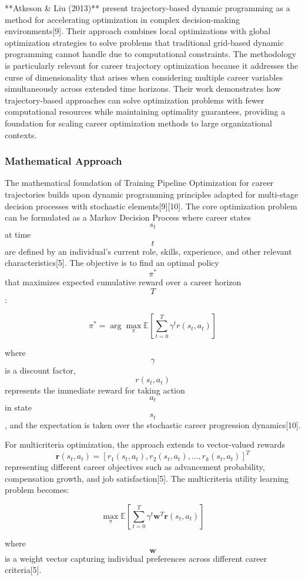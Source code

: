 \documentclass[main.tex]{subfiles}
\begin{document}
**Atkeson \& Liu (2013)** present trajectory-based dynamic programming as a method for accelerating optimization in complex decision-making environments[9]. Their approach combines local optimizations with global optimization strategies to solve problems that traditional grid-based dynamic programming cannot handle due to computational constraints. The methodology is particularly relevant for career trajectory optimization because it addresses the curse of dimensionality that arises when considering multiple career variables simultaneously across extended time horizons. Their work demonstrates how trajectory-based approaches can solve optimization problems with fewer computational resources while maintaining optimality guarantees, providing a foundation for scaling career optimization methods to large organizational contexts.

\subsubsection{Mathematical Approach}

The mathematical foundation of Training Pipeline Optimization for career trajectories builds upon dynamic programming principles adapted for multi-stage decision processes with stochastic elements[9][10]. The core optimization problem can be formulated as a Markov Decision Process where career states $$s_t$$ at time $$t$$ are defined by an individual's current role, skills, experience, and other relevant characteristics[5]. The objective is to find an optimal policy $$\pi^*$$ that maximizes expected cumulative reward over a career horizon $$T$$:

$$
\pi^* = \arg\max_\pi \mathbb{E}\left[\sum_{t=0}^T \gamma^t r(s_t, a_t)\right]
$$

where $$\gamma$$ is a discount factor, $$r(s_t, a_t)$$ represents the immediate reward for taking action $$a_t$$ in state $$s_t$$, and the expectation is taken over the stochastic career progression dynamics[10].

For multicriteria optimization, the approach extends to vector-valued rewards $$\mathbf{r}(s_t, a_t) = [r_1(s_t, a_t), r_2(s_t, a_t), \ldots, r_k(s_t, a_t)]^T$$ representing different career objectives such as advancement probability, compensation growth, and job satisfaction[5]. The multicriteria utility learning problem becomes:

$$
\max_\pi \mathbb{E}\left[\sum_{t=0}^T \gamma^t \mathbf{w}^T \mathbf{r}(s_t, a_t)\right]
$$

where $$\mathbf{w}$$ is a weight vector capturing individual preferences across different career criteria[5].
\end{document}

